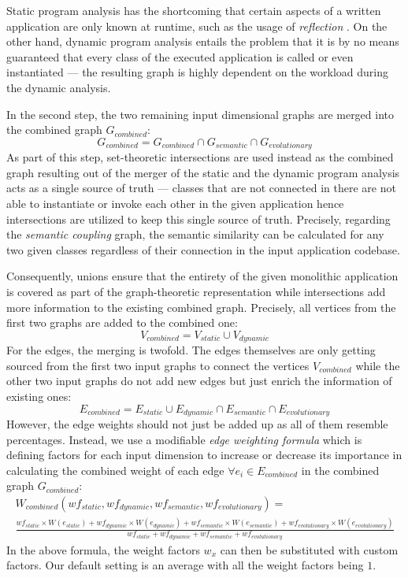 \documentclass[12pt,a4paper]{report}
\begin{document}
Static program analysis has the shortcoming that certain aspects of a written
application are only known at runtime, such as the usage of \textit{reflection}
\cite{landman2017reflection}. On the other hand, dynamic program analysis
entails the problem that it is by no means guaranteed that every class of the
executed application is called or even instantiated --- the resulting graph is
highly dependent on the workload during the dynamic analysis.

In the second step, the two remaining input dimensional graphs are merged into
the combined graph \(G_{combined}\):
\[
  G_{combined} = G_{combined} \cap G_{semantic} \cap G_{evolutionary}
\]
As part of this step, set-theoretic
intersections are used instead as the combined graph resulting out of the
merger of the static and the dynamic program analysis acts as a single source
of truth --- classes that are not connected in there are not able to
instantiate or invoke each other in the given application hence intersections
are utilized to keep this single source of truth. Precisely, regarding the
\textit{semantic coupling} graph, the semantic similarity can be calculated for
any two given classes regardless of their connection in the input application
codebase.

Consequently, unions ensure that the entirety of the given monolithic
application is covered as part of the graph-theoretic representation while
intersections add more information to the existing combined graph. Precisely,
all vertices from the first two graphs are added to the combined one:
\[
  V_{combined} = V_{static} \cup V_{dynamic}
\]
For the edges, the merging is
twofold. The edges themselves are only getting sourced from the first two input
graphs to connect the vertices \(V_{combined}\) while the other two input
graphs do not add new edges but just enrich the information of existing ones:
\[
  E_{combined} = E_{static} \cup E_{dynamic} \cap E_{semantic} \cap E_{evolutionary}
\]
However, the edge weights should not just be added up as all
of them resemble percentages. Instead, we use a modifiable \textit{edge
weighting formula} which is defining factors for each input dimension to
increase or decrease its importance in calculating the combined weight of each
edge \(\forall e_i \in E_{combined}\) in the combined graph \(G_{combined}\):
\tiny
\begin{equation*}
\begin{split}
  W_{combined}(wf_{static}, wf_{dynamic}, wf_{semantic}, wf_{evolutionary}) = \\
  \frac{
    wf_{static} \times W(e_{static}) +
    wf_{dynamic} \times W(e_{dynamic}) +
    wf_{semantic} \times W(e_{semantic}) +
    wf_{evolutionary} \times W(e_{evolutionary})
  }{
    wf_{static} +
    wf_{dynamic} +
    wf_{semantic} +
    wf_{evolutionary}
  }
\end{split}
\end{equation*}
\normalsize
In the above formula, the weight factors \(w_x\) can then be substituted with custom
factors. Our default setting is an average with all the weight factors being \(1\).
\end{document}
